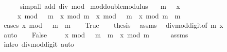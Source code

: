 \begin{isabellebody}
\ \ \ \ \isamarkupfalse%
\ {\isacharparenleft}{\kern0pt}simp{\isacharunderscore}{\kern0pt}all\ add{\isacharcolon}{\kern0pt}\ div\ mod{\isacharparenright}{\kern0pt}\isanewline
{}\isamarkupfalse%
%
\endisatagproof
{\isafoldproof}%
%
\isadelimproof
\isanewline
%
\endisadelimproof
\isanewline
{}\isamarkupfalse%
\ mod{\isacharunderscore}{\kern0pt}double{\isacharunderscore}{\kern0pt}modulus{\isacharcolon}{\kern0pt}\isanewline
\ \ \ {\isachardoublequoteopen}m\ {\isachargreater}{\kern0pt}\ {}{\isachardoublequoteclose}\ {\isachardoublequoteopen}x\ {\isasymge}\ {}{\isachardoublequoteclose}\isanewline
\ \ \ \ \ {\isachardoublequoteopen}x\ mod\ {\isacharparenleft}{\kern0pt}{}\ {\isacharasterisk}{\kern0pt}\ m{\isacharparenright}{\kern0pt}\ {\isacharequal}{\kern0pt}\ x\ mod\ m\ {\isasymor}\ x\ mod\ {\isacharparenleft}{\kern0pt}{}\ {\isacharasterisk}{\kern0pt}\ m{\isacharparenright}{\kern0pt}\ {\isacharequal}{\kern0pt}\ x\ mod\ m\ {\isacharplus}{\kern0pt}\ m{\isachardoublequoteclose}\isanewline
%
\isadelimproof
%
\endisadelimproof
%
\isatagproof
{}\isamarkupfalse%
\ {\isacharparenleft}{\kern0pt}cases\ {\isachardoublequoteopen}x\ mod\ {\isacharparenleft}{\kern0pt}{}\ {\isacharasterisk}{\kern0pt}\ m{\isacharparenright}{\kern0pt}\ {\isacharless}{\kern0pt}\ m{\isachardoublequoteclose}{\isacharparenright}{\kern0pt}\isanewline
\ \ \isamarkupfalse%
\ True\isanewline
\ \ \isamarkupfalse%
\ {\isacharquery}{\kern0pt}thesis\ \isamarkupfalse%
\ assms\ \isamarkupfalse%
\ divmod{\isacharunderscore}{\kern0pt}digit{\isacharunderscore}{\kern0pt}{}{\isacharparenleft}{\kern0pt}{}{\isacharparenright}{\kern0pt}{\isacharbrackleft}{\kern0pt}of\ m\ x{\isacharbrackright}{\kern0pt}\ \isamarkupfalse%
\ auto\isanewline
{}\isamarkupfalse%
\isanewline
\ \ \isamarkupfalse%
\ False\isanewline
\ \ \isamarkupfalse%
\ {\isacharasterisk}{\kern0pt}{\isacharcolon}{\kern0pt}\ {\isachardoublequoteopen}x\ mod\ {\isacharparenleft}{\kern0pt}{}\ {\isacharasterisk}{\kern0pt}\ m{\isacharparenright}{\kern0pt}\ {\isacharminus}{\kern0pt}\ m\ {\isacharequal}{\kern0pt}\ x\ mod\ m{\isachardoublequoteclose}\isanewline
\ \ \ \ \isamarkupfalse%
\ assms\ \isamarkupfalse%
\ {\isacharparenleft}{\kern0pt}intro\ divmod{\isacharunderscore}{\kern0pt}digit{\isacharunderscore}{\kern0pt}{}{\isacharparenright}{\kern0pt}\ auto\isanewline

\end{isabellebody}
